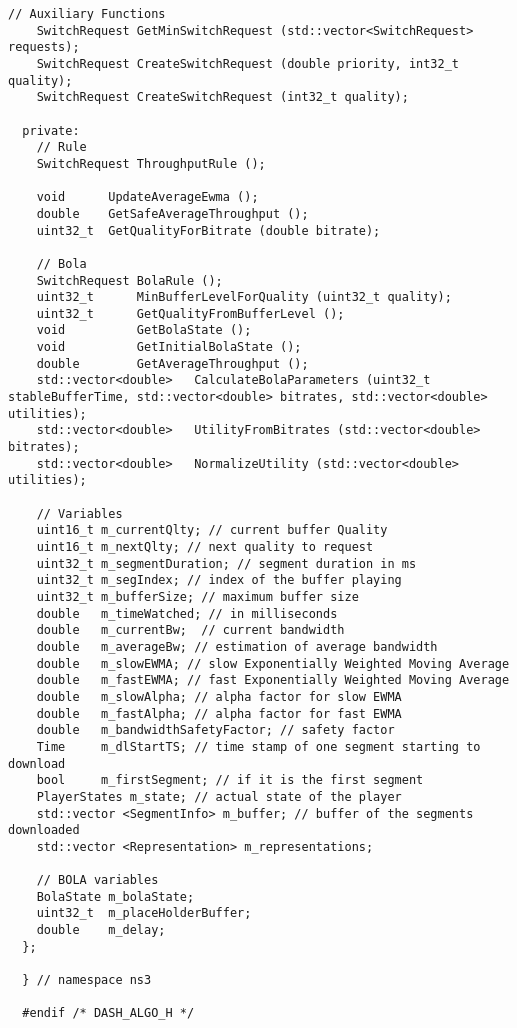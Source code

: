 \begin{lstlisting}[language=myC++, caption={DASHjs.h}, captionpos=b]
    // Auxiliary Functions
    SwitchRequest GetMinSwitchRequest (std::vector<SwitchRequest> requests);
    SwitchRequest CreateSwitchRequest (double priority, int32_t quality);
    SwitchRequest CreateSwitchRequest (int32_t quality);
  
  private:
    // Rule
    SwitchRequest ThroughputRule ();
  
    void      UpdateAverageEwma ();
    double    GetSafeAverageThroughput ();
    uint32_t  GetQualityForBitrate (double bitrate);
  
    // Bola
    SwitchRequest BolaRule ();
    uint32_t      MinBufferLevelForQuality (uint32_t quality);
    uint32_t      GetQualityFromBufferLevel ();
    void          GetBolaState ();
    void          GetInitialBolaState ();
    double        GetAverageThroughput ();
    std::vector<double>   CalculateBolaParameters (uint32_t stableBufferTime, std::vector<double> bitrates, std::vector<double> utilities);
    std::vector<double>   UtilityFromBitrates (std::vector<double> bitrates);
    std::vector<double>   NormalizeUtility (std::vector<double> utilities);
  
    // Variables
    uint16_t m_currentQlty; // current buffer Quality
    uint16_t m_nextQlty; // next quality to request
    uint32_t m_segmentDuration; // segment duration in ms
    uint32_t m_segIndex; // index of the buffer playing
    uint32_t m_bufferSize; // maximum buffer size
    double   m_timeWatched; // in milliseconds
    double   m_currentBw;  // current bandwidth
    double   m_averageBw; // estimation of average bandwidth
    double   m_slowEWMA; // slow Exponentially Weighted Moving Average
    double   m_fastEWMA; // fast Exponentially Weighted Moving Average
    double   m_slowAlpha; // alpha factor for slow EWMA
    double   m_fastAlpha; // alpha factor for fast EWMA
    double   m_bandwidthSafetyFactor; // safety factor
    Time     m_dlStartTS; // time stamp of one segment starting to download
    bool     m_firstSegment; // if it is the first segment
    PlayerStates m_state; // actual state of the player
    std::vector <SegmentInfo> m_buffer; // buffer of the segments downloaded
    std::vector <Representation> m_representations;
  
    // BOLA variables
    BolaState m_bolaState;
    uint32_t  m_placeHolderBuffer;
    double    m_delay;
  };
  
  } // namespace ns3
  
  #endif /* DASH_ALGO_H */
\end{lstlisting}
